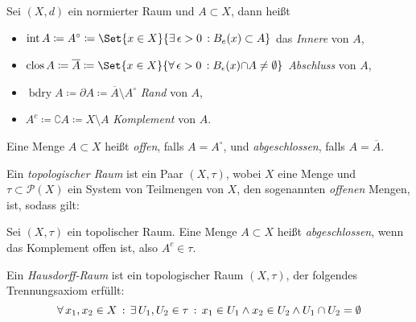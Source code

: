 \documentclass{cheat-sheet}
\newcommand{\inte}{\mathop{\mathrm{int}}} %
\newcommand{\clos}{\mathop{\mathrm{clos}}} %
\newcommand{\bdry}{\mathop{\mathrm{bdry}}} %
\begin{document}
\begin{definition}
  Sei $(X, d)$ ein normierter Raum und $A \subset X$, dann heißt
  \begin{itemize}
    \item $\inte A \coloneqq A^\circ \coloneqq \Set{x \in X}{ \ex{\epsilon > 0} \! B_e(x) \subset A }$ das \emph{Innere} von $A$,
    \item $\clos A \coloneqq \overline{A} \coloneqq \Set{x \in X}{ \fa{\epsilon > 0} \! B_\epsilon(x) {\cap} A \not= \emptyset }$ \emph{Abschluss} von $A$,
    \item $\bdry A \coloneqq \partial A \coloneqq \overline{A} \setminus A^\circ$ \emph{Rand} von $A$,
    \item $A^c \coloneqq \complement A \coloneqq X \setminus A$ \emph{Komplement} von $A$.
  \end{itemize}
\end{definition}

\begin{definition}
  Eine Menge $A \subset X$ heißt \emph{offen}, falls $A = A^\circ$, und \emph{abgeschlossen}, falls $A = \overline{A}$.
\end{definition}


\begin{definition}
  Ein \emph{topologischer Raum} ist ein Paar $(X, \tau)$, wobei $X$ eine Menge und $\tau \subset \mathcal{P}(X)$ ein System von Teilmengen von $X$, den sogenannten \emph{offenen} Mengen, ist, sodass gilt:
  \vspace{-4pt}
  \begin{itemize}
  \end{itemize}
\end{definition}

\begin{definition}
  Sei $(X, \tau)$ ein topolischer Raum. Eine Menge $A \subset X$ heißt \emph{abgeschlossen}, wenn das Komplement offen ist, also $A^c \in \tau$.
\end{definition}

\begin{definition}
  Ein \emph{Hausdorff-Raum} ist ein topologischer Raum $(X, \tau)$, der folgendes Trennungsaxiom erfüllt:
  \[ \forall \, {x_1, x_2 \in X} \,:\, \exists \, {U_1, U_2 \in \tau} \,:\, x_1 \in U_1 \wedge x_2 \in U_2 \wedge U_1 \cap U_2 = \emptyset \]
\end{definition}
\end{document}
